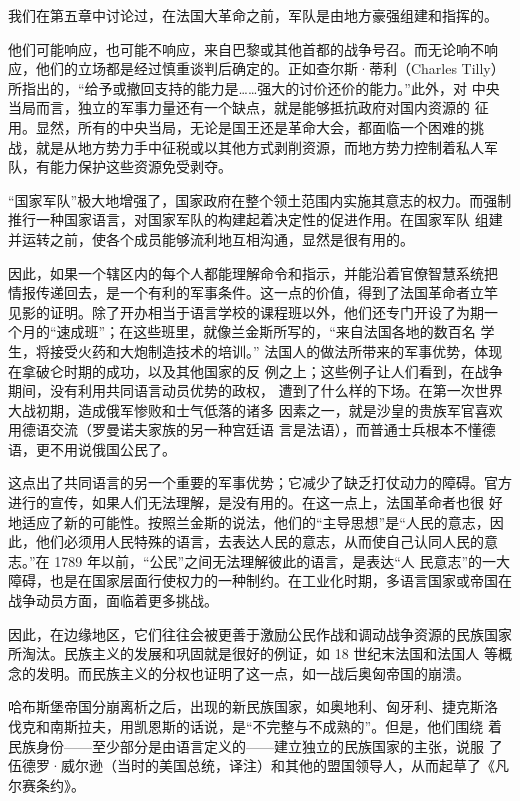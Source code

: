 我们在第五章中讨论过，在法国大革命之前，军队是由地方豪强组建和指挥的。

他们可能响应，也可能不响应，来自巴黎或其他首都的战争号召。而无论响不响应，他们的立场都是经过慎重谈判后确定的。正如查尔斯·蒂利（Charles Tilly）所指出的，“给予或撤回支持的能力是……强大的讨价还价的能力。”此外，对 中央当局而言，独立的军事力量还有一个缺点，就是能够抵抗政府对国内资源的 征用。显然，所有的中央当局，无论是国王还是革命大会，都面临一个困难的挑 战，就是从地方势力手中征税或以其他方式剥削资源，而地方势力控制着私人军队，有能力保护这些资源免受剥夺。

“国家军队”极大地增强了，国家政府在整个领土范围内实施其意志的权力。而强制推行一种国家语言，对国家军队的构建起着决定性的促进作用。在国家军队 组建并运转之前，使各个成员能够流利地互相沟通，显然是很有用的。

因此，如果一个辖区内的每个人都能理解命令和指示，并能沿着官僚智慧系统把 情报传递回去，是一个有利的军事条件。这一点的价值，得到了法国革命者立竿 见影的证明。除了开办相当于语言学校的课程班以外，他们还专门开设了为期一 个月的“速成班”；在这些班里，就像兰金斯所写的，“来自法国各地的数百名 学生，将接受火药和大炮制造技术的培训。” 法国人的做法所带来的军事优势，体现在拿破仑时期的成功，以及其他国家的反 例之上；这些例子让人们看到，在战争期间，没有利用共同语言动员优势的政权， 遭到了什么样的下场。在第一次世界大战初期，造成俄军惨败和士气低落的诸多 因素之一，就是沙皇的贵族军官喜欢用德语交流（罗曼诺夫家族的另一种宫廷语 言是法语），而普通士兵根本不懂德语，更不用说俄国公民了。

这点出了共同语言的另一个重要的军事优势；它减少了缺乏打仗动力的障碍。官方进行的宣传，如果人们无法理解，是没有用的。在这一点上，法国革命者也很 好地适应了新的可能性。按照兰金斯的说法，他们的“主导思想”是“人民的意志，因此，他们必须用人民特殊的语言，去表达人民的意志，从而使自己认同人民的意志。”在 1789 年以前，“公民”之间无法理解彼此的语言，是表达“人 民意志”的一大障碍，也是在国家层面行使权力的一种制约。在工业化时期，多语言国家或帝国在战争动员方面，面临着更多挑战。

因此，在边缘地区，它们往往会被更善于激励公民作战和调动战争资源的民族国家所淘汰。民族主义的发展和巩固就是很好的例证，如 18 世纪末法国和法国人 等概念的发明。而民族主义的分权也证明了这一点，如一战后奥匈帝国的崩溃。

哈布斯堡帝国分崩离析之后，出现的新民族国家，如奥地利、匈牙利、捷克斯洛 伐克和南斯拉夫，用凯恩斯的话说，是“不完整与不成熟的”。但是，他们围绕 着民族身份——至少部分是由语言定义的——建立独立的民族国家的主张，说服 了伍德罗·威尔逊（当时的美国总统，译注）和其他的盟国领导人，从而起草了《凡尔赛条约》。

